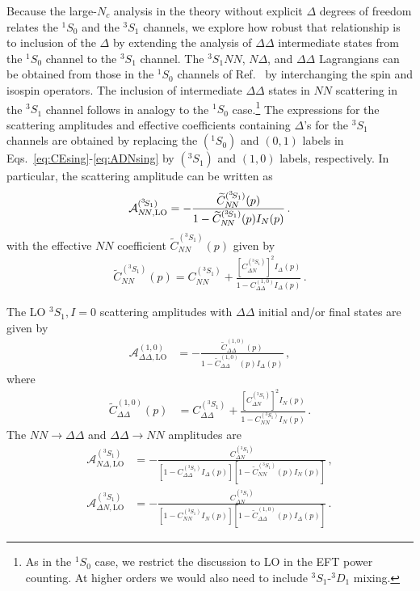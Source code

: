 \documentclass[nofootinbib, preprint, aps, prc, superscriptaddress,11pt]{revtex4-1}
\newcommand{\Nc}{\ensuremath{N_c}\xspace}
\newcommand{\NN}{\ensuremath{N\!N}\xspace}
\newcommand{\oneS}{\ensuremath{{{}^{1}\!S_0}}\xspace}
\newcommand{\threeS}{\ensuremath{{{}^{3}\!S_1}}\xspace}
\newcommand{\threeD}{\ensuremath{{{}^{3}\!D_1}}\xspace}
\newcommand\SD{\ensuremath{\threeS\text{-}\threeD}\xspace}
\newcommand{\calA}{\ensuremath{\mathcal{A}}}
\newcommand{\1}{\mathbbm{1}}
\newcommand{\CNNtrip}{\ensuremath{C_{\NN}^{(^3 \! S_1)}}\xspace}
\newcommand{\CNDtrip}{\ensuremath{C_{\Delta N}^{(^3 \! S_1)}}\xspace}
\newcommand{\CDDtrip}{\ensuremath{C_{\Delta\Delta}^{(1,0)}}\xspace}
\newcommand{\CeffTrip}{\ensuremath{\widetilde C_{\NN}^{(\threeS)}}\xspace}
\newcommand{\CDDeffTrip}{\ensuremath{\widetilde C_{\Delta\Delta}^{(1,0)}}\xspace}
\newcommand{\D}{\ensuremath{\Delta}\xspace}
\newcommand{\DD}{\ensuremath{\Delta\Delta}\xspace}
\newcommand{\ND}{\ensuremath{N\!\Delta}\xspace}
\begin{document}
Because the large-\Nc analysis in the theory without explicit \D degrees of freedom relates the \oneS and the \threeS channels, we explore how robust that relationship is to inclusion of the \D by extending the analysis of $\DD$ intermediate states from the $\oneS$ channel \cite{Savage:1996tb} to the $\threeS$ channel.
The \threeS \NN, \ND, and \DD Lagrangians can be obtained from those in the \oneS channels of Ref.~\cite{Savage:1996tb} by interchanging the spin and isospin operators. 
The inclusion of intermediate \DD states in \NN scattering in the \threeS channel follows in analogy to the \oneS case.\footnote{As in the \oneS case, we restrict the discussion to LO in the EFT power counting. At higher orders we would also need to include \SD mixing.} 
The expressions for the scattering amplitudes and effective coefficients containing $\D$'s for the \threeS channels are obtained by replacing the $(\oneS)$ and $(0,1)$ labels in Eqs.~\eqref{eq:CEsing}-\eqref{eq:ADNsing} by $(\threeS)$ and $(1,0)$ labels, respectively.
In particular, the scattering amplitude can be written as 
\begin{align}
\label{eq:Atrip}
    \calA_\text{\NN,LO}^{(\threeS)} = - \frac{\CeffTrip(p)}{1-\CeffTrip(p) I_{N}(p)}\, .
\end{align}
with the effective \NN coefficient $\CeffTrip (p)$ given by
\begin{align}
\label{eq:CEtrip}
    \CeffTrip(p) = \CNNtrip + \frac{\left[ \CNDtrip \right]^2 I_{\D}(p)}{1-\CDDtrip I_{\D}(p)} \, . 
\end{align}

The LO $\threeS,I=0$ scattering amplitudes with \DD initial and/or final states are given by
    \begin{align}
        \calA^{(1,0)}_{\DD, \text{LO}} & = - \frac{ \CDDeffTrip(p) }{ 1 - \CDDeffTrip(p) I_{\D}(p)} \, ,
    \end{align}
where 
    \begin{align}
        \CDDeffTrip(p) & = C_{\DD}^{(\threeS)} + \frac{ \left[ C_{\Delta N}^{(\threeS)} \right]^2 I_{N}(p)  }{1 - C_{\NN}^{(\threeS)} I_{N}(p)} \, .
    \end{align}
The $\NN \to \DD$ and $\DD \to \NN$ amplitudes are 
    \begin{align}
        \label{eq:ANDtrip}
        \calA^{(\threeS)}_{N\D, \text{LO}} & = - \frac{C^{(\threeS)}_{\Delta N}}{ \left[1 - C_{\DD}^{(\threeS)} I_{\D}(p) \right] \left[ 1 - \CeffTrip(p) I_{N}(p) \right]} \, , \\
        \label{eq:ADNtrip}
        \calA^{(\threeS)}_{\D N, \text{LO}} & = - \frac{C^{(\threeS)}_{\Delta N}}{ \left[ 1 - C_{\NN}^{(\threeS)} I_{N}(p) \right] \left[ 1 - \CDDeffTrip(p) I_{\D}(p) \right]} \, .
    \end{align}
\end{document}
